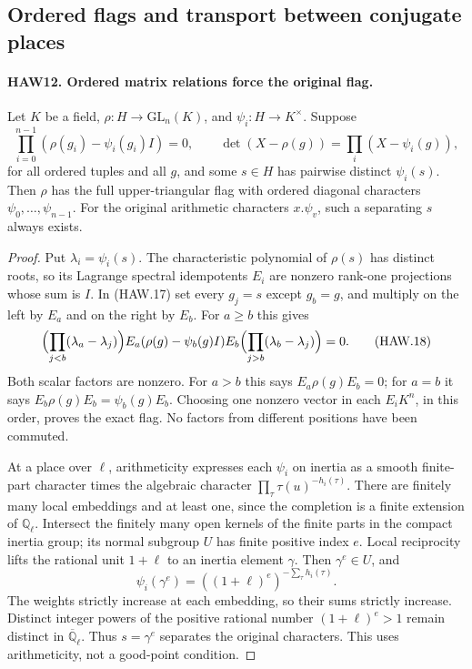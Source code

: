 \subsection{Ordered flags and transport between conjugate places}

\paragraph{HAW12. Ordered matrix relations force the original flag.}
\label{claim:HAW12}
Let $K$ be a field, $\rho:H\to\mathrm{GL}_n(K)$, and
$\psi_i:H\to K^\times$.  Suppose
\[
 \prod_{i=0}^{n-1}(\rho(g_i)-\psi_i(g_i)I)=0,\qquad
 \det(X-\rho(g))=\prod_i(X-\psi_i(g)),
 \tag{HAW.17}
\]
for all ordered tuples and all $g$, and some $s\in H$
has pairwise distinct $\psi_i(s)$.  Then $\rho$ has the
full upper-triangular flag with ordered diagonal characters
$\psi_0,\ldots,\psi_{n-1}$.  For the original arithmetic
characters $x.\psi_v$, such a separating $s$ always exists.
\begin{proof}
Put $\lambda_i=\psi_i(s)$.  The characteristic polynomial
of $\rho(s)$ has distinct roots, so its Lagrange spectral
idempotents $E_i$ are nonzero rank-one projections whose sum
is $I$.  In (HAW.17) set every $g_j=s$ except $g_b=g$,
and multiply on the left by $E_a$ and on the right by $E_b$.
For $a\ge b$ this gives
\[
 \Bigl(\prod_{j<b}(\lambda_a-\lambda_j)\Bigr)
 E_a(\rho(g)-\psi_b(g)I)E_b
 \Bigl(\prod_{j>b}(\lambda_b-\lambda_j)\Bigr)=0.
 \tag{HAW.18}
\]
Both scalar factors are nonzero.  For $a>b$ this says
$E_a\rho(g)E_b=0$; for $a=b$ it says
$E_b\rho(g)E_b=\psi_b(g)E_b$.  Choosing one nonzero vector
in each $E_iK^n$, in this order, proves the exact flag.
No factors from different positions have been commuted.

At a place over $\ell$, arithmeticity expresses each
$\psi_i$ on inertia as a smooth finite-part character times
the algebraic character $\prod_\tau\tau(u)^{-h_i(\tau)}$.
There are finitely many local embeddings and at least one,
since the completion is a finite extension of $\mathbb Q_\ell$.
Intersect the finitely many open kernels of the finite parts
in the compact inertia group; its normal subgroup $U$ has
finite positive index $e$.  Local reciprocity lifts the
rational unit $1+\ell$ to an inertia element $\gamma$.
Then $\gamma^e\in U$, and
\[
       \psi_i(\gamma^e)
                  =((1+\ell)^e)^{-\sum_\tau h_i(\tau)}.
 \tag{HAW.19}
\]
The weights strictly increase at each embedding, so their
sums strictly increase.  Distinct integer powers of the
positive rational number $(1+\ell)^e>1$ remain distinct
in $\overline{\mathbb Q}_\ell$.  Thus $s=\gamma^e$
separates the original characters.  This uses arithmeticity,
not a good-point condition.
\end{proof}

